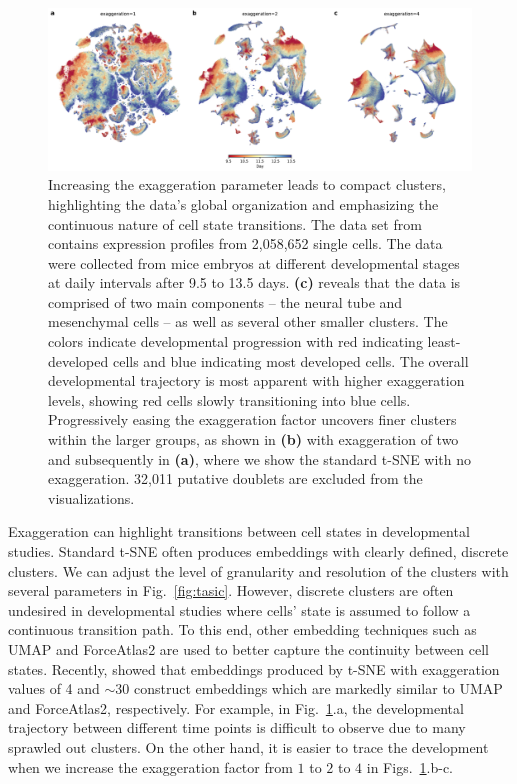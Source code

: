 \documentclass[article]{jss}
\begin{document}
\begin{figure}[htbp]
  \includegraphics[width=\textwidth]{cao2019}
  \caption{\label{fig:cao}
  Increasing the exaggeration parameter leads to compact clusters, highlighting
  the data's global organization and emphasizing the continuous nature of
  cell state transitions. The data set from \citet{cao2019single}
  contains expression profiles from 2,058,652 single cells. The data were
  collected from mice embryos at different developmental stages at daily
  intervals after 9.5 to 13.5 days. \textbf{(c)} reveals that the data is
  comprised of two main components -- the neural tube and mesenchymal
  cells -- as well as several other smaller clusters. The
  colors indicate developmental progression with red indicating
  least-developed cells and blue indicating most developed cells. The
  overall developmental trajectory is most apparent with higher
  exaggeration levels, showing red cells slowly transitioning into blue
  cells. Progressively easing the exaggeration factor uncovers finer
  clusters within the larger groups, as shown in \textbf{(b)} with
  exaggeration of two and subsequently in \textbf{(a)}, where we show the
  standard t-SNE with no exaggeration. 32,011 putative doublets are
  excluded from the visualizations.
}
\end{figure}

Exaggeration can highlight transitions between cell states in developmental
studies. Standard t-SNE often produces embeddings with clearly defined, discrete
clusters. We can adjust the level of granularity and resolution of the clusters
with several parameters in Fig.~\ref{fig:tasic}. However, discrete clusters are
often undesired in developmental studies where cells' state is assumed to follow
a continuous transition path. To this end, other embedding techniques such as
UMAP and ForceAtlas2 are used to better capture the continuity between cell
states. Recently, \citet{bohm2020unifying} showed that
embeddings produced by t-SNE with exaggeration values of 4 and $\sim30$
construct embeddings which are markedly similar to UMAP and ForceAtlas2,
respectively. For example, in Fig.~\ref{fig:cao}.a, the developmental trajectory
between different time points is difficult to observe due to many sprawled out
clusters. On the other hand, it is easier to trace the development when we
increase the exaggeration factor from $1$ to $2$ to $4$ in
Figs.~\ref{fig:cao}.b-c.
\end{document}
